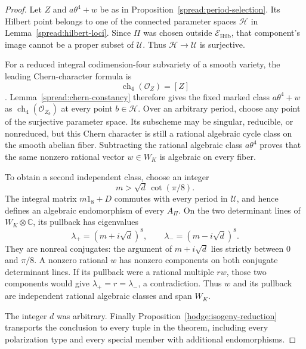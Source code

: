 \documentclass[11pt]{article}
\theoremstyle{definition}
\theoremstyle{remark}
\newcommand{\C}{\mathbb C}
\DeclareMathOperator{\ch}{ch}
\numberwithin{equation}{section}
\begin{document}
\begin{proof}
Let $Z$ and $a\theta^4+w$ be as in
Proposition~\ref{spread:period-selection}.  Its Hilbert point belongs
to one of the connected parameter spaces $\mathcal H$ in
Lemma~\ref{spread:hilbert-loci}.  Since $\Pi$ was chosen outside
$\mathcal E_{\mathrm{Hilb}}$, that component's image cannot be a
proper subset of $\mathcal U$.  Thus $\mathcal H\to\mathcal U$
is surjective.

For a reduced integral codimension-four subvariety of a smooth variety,
the leading Chern-character formula is
\[
 \ch_4(\mathcal O_Z)=[Z]
\]
\cite{fulton-intersection}.  Lemma~\ref{spread:chern-constancy}
therefore gives the fixed marked class $a\theta^4+w$ as
$\ch_4(\mathcal O_{Z_b})$ at every point $b\in\mathcal H$.
Over an arbitrary period, choose any point of the surjective parameter
space.  Its subscheme may be singular, reducible, or nonreduced, but
this Chern character is still a rational algebraic cycle class on the
smooth abelian fiber.  Subtracting the rational algebraic class
$a\theta^4$ proves that the same nonzero rational vector $w\in W_K$
is algebraic on every fiber.

To obtain a second independent class, choose an integer
\[
 m>\sqrt d\,\cot(\pi/8).
\]
The integral matrix $m1_8+D$ commutes with every period in $\mathcal U$,
and hence defines an algebraic endomorphism of every $A_\Pi$.  On the
two determinant lines of $W_K\otimes\C$, its pullback has eigenvalues
\[
 \lambda_+=(m+i\sqrt d)^8,\qquad
 \lambda_-=(m-i\sqrt d)^8.
\]
They are nonreal conjugates: the argument of $m+i\sqrt d$ lies
strictly between $0$ and $\pi/8$.  A nonzero rational $w$ has nonzero
components on both conjugate determinant lines.  If its pullback were
a rational multiple $r w$, those two components would give
$\lambda_+=r=\lambda_-$, a contradiction.  Thus $w$ and its pullback
are independent rational algebraic classes and span $W_K$.

The integer $d$ was arbitrary.  Finally
Proposition~\ref{hodge:isogeny-reduction} transports the conclusion
to every tuple in the theorem, including every polarization type and
every special member with additional endomorphisms.
\end{proof}
\end{document}
